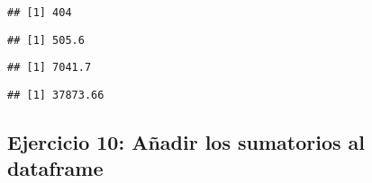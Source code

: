 \documentclass[
]{article}
\newenvironment{Shaded}{\begin{snugshade}}{\end{snugshade}}
\newcommand{\FunctionTok}[1]{\textcolor[rgb]{0.00,0.00,0.00}{#1}}
\newcommand{\NormalTok}[1]{#1}
\newcommand{\OtherTok}[1]{\textcolor[rgb]{0.56,0.35,0.01}{#1}}
\newcommand{\SpecialCharTok}[1]{\textcolor[rgb]{0.00,0.00,0.00}{#1}}
\begin{document}
\begin{Shaded}
\end{Shaded}

\begin{verbatim}
## [1] 404
\end{verbatim}

\begin{Shaded}
\end{Shaded}

\begin{verbatim}
## [1] 505.6
\end{verbatim}

\begin{Shaded}
\end{Shaded}

\begin{verbatim}
## [1] 7041.7
\end{verbatim}

\begin{Shaded}
\end{Shaded}

\begin{verbatim}
## [1] 37873.66
\end{verbatim}

\hypertarget{ejercicio-10-auxf1adir-los-sumatorios-al-dataframe}{%
\subsection{Ejercicio 10: Añadir los sumatorios al
dataframe}\label{ejercicio-10-auxf1adir-los-sumatorios-al-dataframe}}
\end{document}
